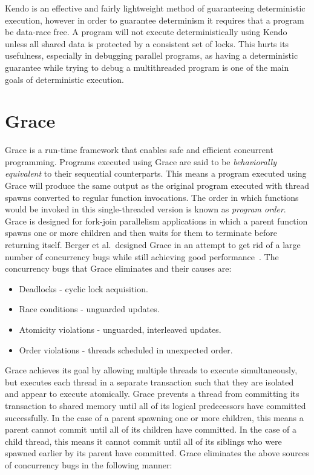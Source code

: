 Kendo is an effective and fairly lightweight method of guaranteeing
deterministic execution, however in order to guarantee determinism it
requires that a program be data-race free.  A program will not execute
deterministically using Kendo unless all shared data is protected by a
consistent set of locks.  This hurts its usefulness, especially in
debugging parallel programs, as having a deterministic guarantee while
trying to debug a multithreaded program is one of the main goals of
deterministic execution.

\section{Grace}

Grace is a run-time framework that enables safe and efficient
concurrent programming.  Programs executed using Grace are said to be
\emph{behaviorally equivalent} to their sequential counterparts.  This
means a program executed using Grace will produce the same output as
the original program executed with thread spawns converted to regular
function invocations.  The order in which functions would be invoked
in this single-threaded version is known as \emph{program order}.
Grace is designed for fork-join parallelism applications in which a
parent function spawns one or more children and then waits for them to
terminate before returning itself.  Berger et al.\ designed Grace in
an attempt to get rid of a large number of concurrency bugs while
still achieving good performance~\cite{grace}.  The concurrency bugs
that Grace eliminates and their causes are:

\begin{itemize}
\item Deadlocks - cyclic lock acquisition.

\item Race conditions - unguarded updates.

\item Atomicity violations - unguarded, interleaved updates.

\item Order violations - threads scheduled in unexpected order.
\end{itemize}

Grace achieves its goal by allowing multiple threads to execute
simultaneously, but executes each thread in a separate transaction
such that they are isolated and appear to execute atomically.  Grace
prevents a thread from committing its transaction to shared memory
until all of its logical predecessors have committed successfully.  In
the case of a parent spawning one or more children, this means a
parent cannot commit until all of its children have committed.  In the
case of a child thread, this means it cannot commit until all of its
siblings who were spawned earlier by its parent have committed.  Grace
eliminates the above sources of concurrency bugs in the following
manner:

